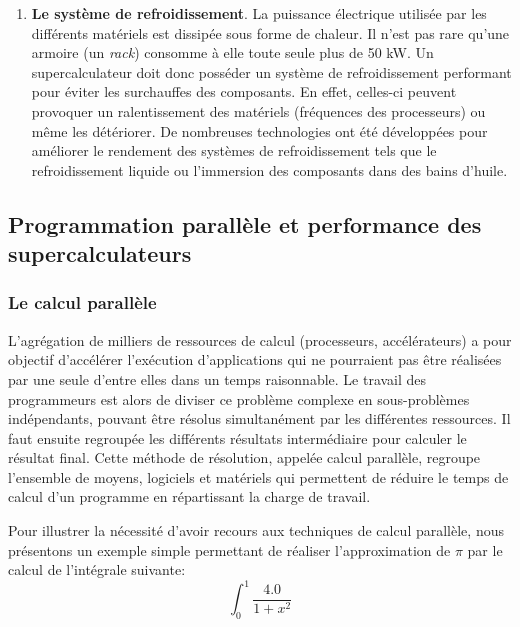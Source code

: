 \begin{enumerate}
    
            \item \textbf{Le système de refroidissement}. La puissance électrique utilisée par les différents matériels est dissipée sous forme de chaleur. Il n'est pas rare qu'une armoire (un \textit{rack}) consomme à elle toute seule plus de 50 kW. Un supercalculateur doit donc posséder un système de refroidissement performant pour éviter les surchauffes des composants. En effet, celles-ci peuvent provoquer un ralentissement des matériels (fréquences des processeurs) ou même les détériorer. De nombreuses technologies ont été développées pour améliorer le rendement des systèmes de refroidissement tels que le refroidissement liquide ou l'immersion des composants dans des bains d'huile.
        \end{enumerate}


\subsection{Programmation parallèle et performance des supercalculateurs}      
\label{sec:prog_parallele}

    \subsubsection{Le calcul parallèle}\label{sec:exemple_pi}
        
        L'agrégation de milliers de ressources de calcul (processeurs, accélérateurs) a pour objectif d'accélérer l'exécution d'applications qui ne pourraient pas être réalisées par une seule d'entre elles dans un temps raisonnable. Le travail des programmeurs est alors de diviser ce problème complexe en sous-problèmes indépendants, pouvant être résolus simultanément par les différentes ressources. Il faut ensuite regroupée les différents résultats intermédiaire pour calculer le résultat final. Cette méthode de résolution, appelée calcul parallèle, regroupe l'ensemble de moyens, logiciels et matériels qui permettent de réduire le temps de calcul d'un programme en répartissant la charge de travail.
       
        Pour illustrer la nécessité d'avoir recours aux techniques de calcul parallèle, nous présentons un exemple simple permettant de réaliser l'approximation de $\pi$ par le calcul de l'intégrale suivante:
        \begin{equation}
        \label{eq_pi}
        \int_{0}^{1} \frac{4.0}{1 + x^{2}}
        \end{equation}
        
